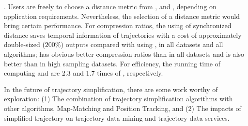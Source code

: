 \emph{}. Users are freely to choose a distance metric from \ped, \sed and \dad, depending on application requirements. Nevertheless, the selection of a distance metric would bring certain performance.
For compression ratios, the using of synchronized distance \sed saves temporal information of trajectories with a cost of approximately double-sized (\ie $200\%$) outputs compared with using \ped, in all datasets and all algorithms; \ped has obvious better compression ratios than \dad in all datasets and \sed is also better than \dad in high sampling datasets.
For efficiency, the running time of computing \ped and \sed are 2.3 and 1.7 times of \dad, respectively.


In the future of trajectory simplification, there are some work worthy of exploration:
(1) The combination of trajectory simplification algorithms with other algorithms, \eg Map-Matching and Position Tracking, and
(2) The impacts of simplified trajectory on trajectory data mining and trajectory data services.

%
%
